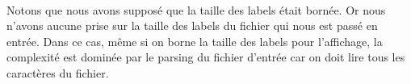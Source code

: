 \paragraph{}Notons que nous avons supposé que la taille des labels était bornée. Or nous n'avons aucune prise sur la taille des labels du fichier qui nous est passé en entrée. Dans ce cas, même si on borne la taille des labels pour l'affichage, la complexité est dominée par le parsing du fichier d'entrée car on doit lire tous les caractères du fichier.